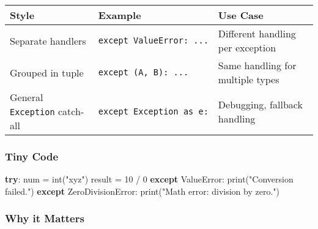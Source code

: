 \documentclass[
  letterpaper,
  DIV=11,
  numbers=noendperiod]{scrreprt}
\newenvironment{Shaded}{\begin{snugshade}}{\end{snugshade}}
\newcommand{\BuiltInTok}[1]{\textcolor[rgb]{0.00,0.23,0.31}{#1}}
\newcommand{\ControlFlowTok}[1]{\textcolor[rgb]{0.00,0.23,0.31}{\textbf{#1}}}
\newcommand{\DecValTok}[1]{\textcolor[rgb]{0.68,0.00,0.00}{#1}}
\newcommand{\NormalTok}[1]{\textcolor[rgb]{0.00,0.23,0.31}{#1}}
\newcommand{\OperatorTok}[1]{\textcolor[rgb]{0.37,0.37,0.37}{#1}}
\newcommand{\PreprocessorTok}[1]{\textcolor[rgb]{0.68,0.00,0.00}{#1}}
\newcommand{\StringTok}[1]{\textcolor[rgb]{0.13,0.47,0.30}{#1}}
\begin{document}
\begin{longtable}[]{@{}
  >{\raggedright\arraybackslash}p{}
  >{\raggedright\arraybackslash}p{}
  >{\raggedright\arraybackslash}p{}@{}}
\toprule\noalign{}
\begin{minipage}[b]{\linewidth}\raggedright
Style
\end{minipage} & \begin{minipage}[b]{\linewidth}\raggedright
Example
\end{minipage} & \begin{minipage}[b]{\linewidth}\raggedright
Use Case
\end{minipage} \\
\midrule\noalign{}
\endhead
\bottomrule\noalign{}
\endlastfoot
Separate handlers & \texttt{except\ ValueError:\ ...} & Different
handling per exception \\
Grouped in tuple & \texttt{except\ (A,\ B):\ ...} & Same handling for
multiple types \\
General \texttt{Exception} catch-all &
\texttt{except\ Exception\ as\ e:} & Debugging, fallback handling \\
\end{longtable}

\subsubsection{Tiny Code}\label{tiny-code-73}

\begin{Shaded}
\begin{Highlighting}[]
\ControlFlowTok{try}\NormalTok{:}
\NormalTok{    num }\OperatorTok{=} \BuiltInTok{int}\NormalTok{(}\StringTok{"xyz"}\NormalTok{)}
\NormalTok{    result }\OperatorTok{=} \DecValTok{10} \OperatorTok{/} \DecValTok{0}
\ControlFlowTok{except} \PreprocessorTok{ValueError}\NormalTok{:}
    \BuiltInTok{print}\NormalTok{(}\StringTok{"Conversion failed."}\NormalTok{)}
\ControlFlowTok{except} \PreprocessorTok{ZeroDivisionError}\NormalTok{:}
    \BuiltInTok{print}\NormalTok{(}\StringTok{"Math error: division by zero."}\NormalTok{)}
\end{Highlighting}
\end{Shaded}

\subsubsection{Why it Matters}\label{why-it-matters-73}
\end{document}
